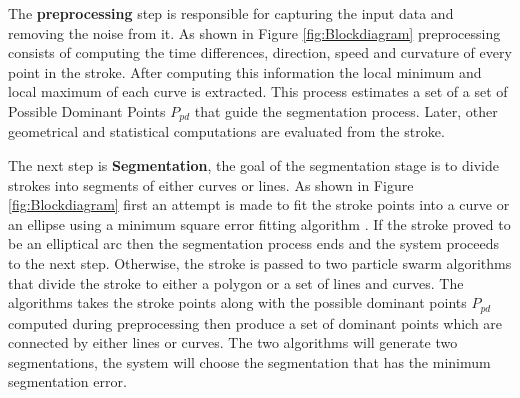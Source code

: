 
The \textbf{preprocessing} step is responsible for capturing the input data and removing the noise from it. As shown in Figure \ref{fig:Blockdiagram} preprocessing consists of computing the time differences, direction, speed and curvature of every point in the stroke. After computing this information the local minimum and local maximum of each curve is extracted. This process estimates a set of a set of Possible Dominant Points $P_{pd}$ that guide the segmentation process. Later, other geometrical and statistical computations are evaluated from the stroke. %
 
  
The next step is \textbf{Segmentation}, the goal of the segmentation stage is to divide strokes into segments of either curves or lines. As shown in Figure \ref{fig:Blockdiagram} first an attempt is made to fit the stroke points into a curve or an ellipse using a minimum square error fitting algorithm \cite{chernov-2003}. If the stroke proved to be an elliptical arc then the segmentation process ends and the system proceeds to the next step. Otherwise, the stroke is passed to two particle swarm algorithms that divide the stroke to either a polygon or a set of lines and curves. The algorithms takes the stroke points along with the possible dominant points $P_{pd}$ computed during preprocessing then produce a set of dominant points which are connected by either lines or curves. The two algorithms will generate two segmentations, the system will choose the segmentation that has the minimum segmentation error.%

 
